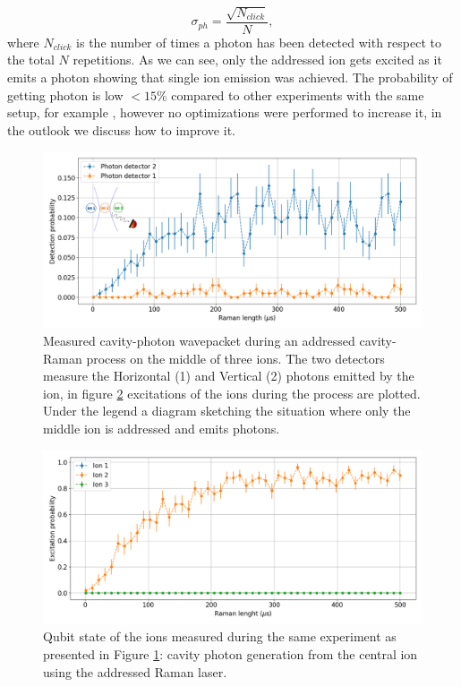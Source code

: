 \begin{equation}
\sigma_{ph} = \frac{\sqrt{N_{click}}}{N},
\end{equation}
where $N_{click}$ is the number of times a photon has been detected with respect to the total $N$ repetitions.
As we can see, only the addressed ion gets excited as it emits a photon showing that single ion emission was achieved. The probability of getting photon is low $<15 \%$ compared to other experiments with the same setup, for example \cite{Krutyanskiy2019}, however no optimizations were performed to increase it, in the outlook we discuss how to improve it.
\begin{figure}[H]
\centering
\includegraphics[width=\textwidth]{img/photonefficency_witherror2}
\caption{Measured cavity-photon wavepacket during an addressed cavity-Raman process on the middle of three ions. The two detectors measure the Horizontal (1) and Vertical (2) photons emitted by the ion, in figure \ref{probion} excitations of the ions during the process are plotted. Under the legend a diagram sketching the situation where only the middle ion is addressed and emits photons.}
\label{probphoton}
\end{figure}
\begin{figure}[H]
\centering
\includegraphics[width=\textwidth]{img/ramanlength_witherrors}
\caption{Qubit state of the ions measured during the same experiment as presented in Figure \ref{probphoton}: cavity photon generation from the central ion using the addressed Raman laser.}
\label{probion}
\end{figure}

